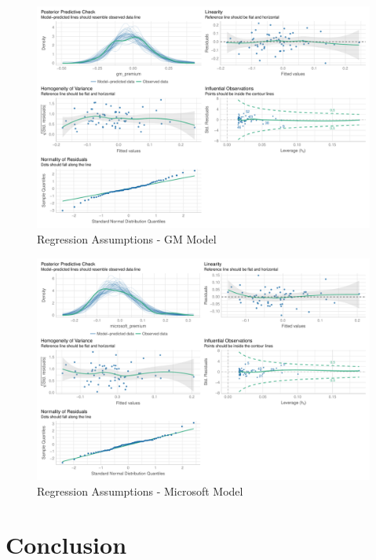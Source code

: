 \documentclass[
]{article}
\begin{document}
\begin{landscape}

\begin{figure}
\centering
\includegraphics{capm_files/figure-latex/unnamed-chunk-14-1.pdf}
\caption{Regression Assumptions - GM Model}
\end{figure}

\newpage

\begin{figure}
\centering
\includegraphics{capm_files/figure-latex/unnamed-chunk-15-1.pdf}
\caption{Regression Assumptions - Microsoft Model}
\end{figure}

\newpage

\end{landscape}

\hypertarget{conclusion}{%
\section{Conclusion}\label{conclusion}}
\end{document}
